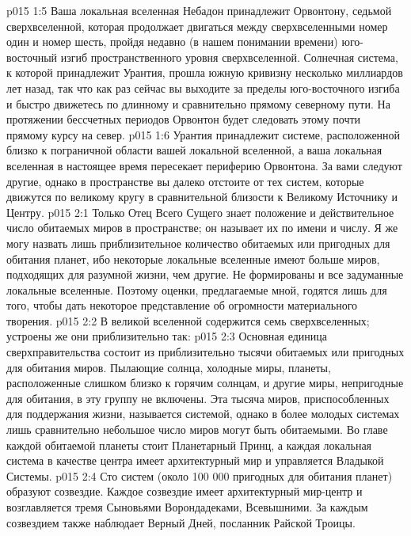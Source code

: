 \vs p015 1:5 Ваша локальная вселенная Небадон принадлежит Орвонтону, седьмой сверхвселенной, которая продолжает двигаться между сверхвселенными номер один и номер шесть, пройдя недавно (в нашем понимании времени) юго\hyp{}восточный изгиб пространственного уровня сверхвселенной. Солнечная система, к которой принадлежит Урантия, прошла южную кривизну несколько миллиардов лет назад, так что как раз сейчас вы выходите за пределы юго\hyp{}восточного изгиба и быстро движетесь по длинному и сравнительно прямому северному пути. На протяжении бессчетных периодов Орвонтон будет следовать этому почти прямому курсу на север.
\vs p015 1:6 Урантия принадлежит системе, расположенной близко к пограничной области вашей локальной вселенной, а ваша локальная вселенная в настоящее время пересекает периферию Орвонтона. За вами следуют другие, однако в пространстве вы далеко отстоите от тех систем, которые движутся по великому кругу в сравнительной близости к Великому Источнику и Центру.
\vs p015 2:1 Только Отец Всего Сущего знает положение и действительное число обитаемых миров в пространстве; он называет их по имени и числу. Я же могу назвать лишь приблизительное количество обитаемых или пригодных для обитания планет, ибо некоторые локальные вселенные имеют больше миров, подходящих для разумной жизни, чем другие. Не формированы и все задуманные локальные вселенные. Поэтому оценки, предлагаемые мной, годятся лишь для того, чтобы дать некоторое представление об огромности материального творения.
\vs p015 2:2 \pc В великой вселенной содержится семь сверхвселенных; устроены же они приблизительно так:
\vs p015 2:3 \pc {}\bibnobreakspace {} Основная единица сверхправительства состоит из приблизительно тысячи обитаемых или пригодных для обитания миров. Пылающие солнца, холодные миры, планеты, расположенные слишком близко к горячим солнцам, и другие миры, непригодные для обитания, в эту группу не включены. Эта тысяча миров, приспособленных для поддержания жизни, называется системой, однако в более молодых системах лишь сравнительно небольшое число миров могут быть обитаемыми. Во главе каждой обитаемой планеты стоит Планетарный Принц, а каждая локальная система в качестве центра имеет архитектурный мир и управляется Владыкой Системы.
\vs p015 2:4 \pc {}\bibnobreakspace {} Сто систем (около 100 000 пригодных для обитания планет) образуют созвездие. Каждое созвездие имеет архитектурный мир\hyp{}центр и возглавляется тремя Сыновьями Ворондадеками, Всевышними. За каждым созвездием также наблюдает Верный Дней, посланник Райской Троицы.
